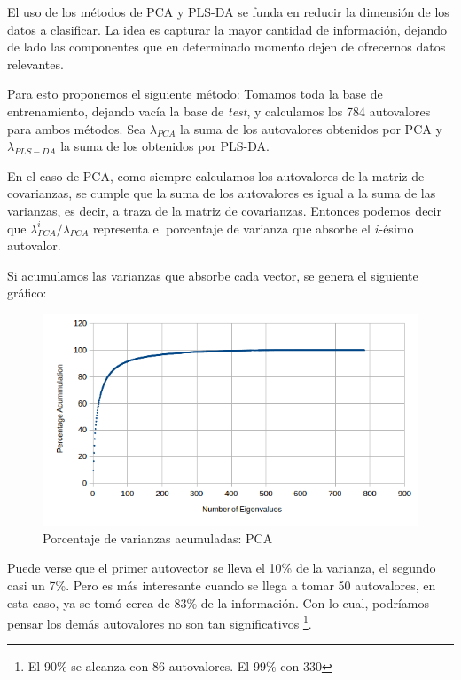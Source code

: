 \label{alpha-gamma}
El uso de los m\'etodos de PCA y PLS-DA se funda en reducir la dimensi\'on de los datos a clasificar. La idea es capturar la mayor cantidad de informaci\'on, dejando de lado las componentes que en determinado momento dejen de ofrecernos datos relevantes.

Para esto proponemos el siguiente m\'etodo: Tomamos toda la base de entrenamiento, dejando vac\'ia la base de \textit{test}, y calculamos los 784 autovalores para ambos m\'etodos. Sea $\lambda_{PCA}$ la suma de los autovalores obtenidos por PCA y $\lambda_{PLS-DA}$ la suma de los obtenidos por PLS-DA.

En el caso de PCA, como siempre calculamos los autovalores de la matriz de covarianzas, se cumple que la suma de los autovalores es igual a la suma de las varianzas, es decir, a traza de la matriz de covarianzas. Entonces podemos decir que $\lambda_{PCA}^{i} / \lambda_{PCA}$ representa el porcentaje de varianza que absorbe el $i$-\'esimo autovalor.

Si acumulamos las varianzas que absorbe cada vector, se genera el siguiente gr\'afico:

\begin{figure}[h!]
  \begin{center}
	\includegraphics[scale=1]{exp4/PCA-percentage.png}
	\caption{Porcentaje de varianzas acumuladas: PCA}
	\label{accum_var_PCA}
  \end{center}
\end{figure}

Puede verse que el primer autovector se lleva el 10\% de la varianza, el segundo casi un 7\%. Pero es m\'as interesante cuando se llega a tomar 50 autovalores, en esta caso, ya se tom\'o cerca de 83\% de la informaci\'on. Con lo cual, podr\'iamos pensar los dem\'as autovalores no son tan significativos \footnote{El 90\% se alcanza con 86 autovalores. El 99\% con 330}.

